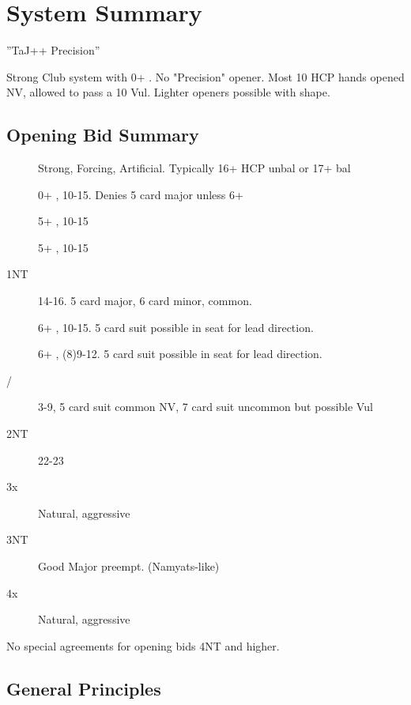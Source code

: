 \documentclass[tom-ari]{subfile}
\begin{document}
	
\chapter{System Summary}


''TaJ++ Precision'' %

Strong Club system with 0+ .  No "Precision"  opener.  Most 10 HCP hands opened NV, allowed to pass a 10 Vul. Lighter openers possible with shape.  

\section{Opening Bid Summary}

\begin{description}
	\item[] Strong, Forcing, Artificial.  Typically 16+ HCP unbal or 17+ bal
	\item[] 0+ \ddd, 10-15.  Denies 5 card major unless 6+ \ddd
	\item[] 5+ \hhh, 10-15
	\item[] 5+ \sss, 10-15
	\item[1NT] 14-16.  5 card major, 6 card minor,  common.
	\item[] 6+ \ccc, 10-15.  5 card suit possible in \third seat for lead direction.
	\item[] 6+ \ddd, (8)9-12.  5 card suit possible in \third seat for lead direction.
	\item[/\sss] 3-9, 5 card suit common NV, 7 card suit uncommon but possible Vul
	\item[2NT] 22-23
	\item[3x] Natural, aggressive
	\item[3NT] Good Major preempt.  (Namyats-like)
	\item[4x] Natural, aggressive
\end{description}

No special agreements for opening bids 4NT and higher.

\section{General Principles}
\end{document}

